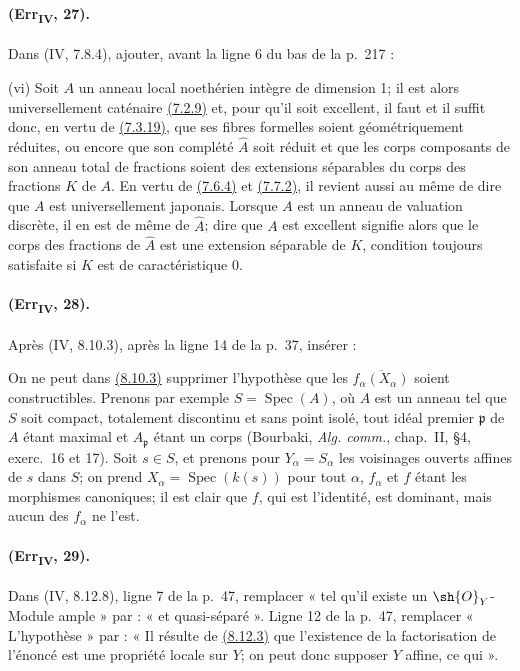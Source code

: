 \paragraph{(Err\textsubscript{IV}, 27).}
Dans (IV, 7.8.4), ajouter, avant la ligne 6 du bas de la p.~217 :

\smallskip
\noindent
\textup{(vi)} Soit $A$ un anneau local noethérien intègre de dimension
1; il est alors universellement caténaire
{\hyperlink{ega4.c04.cor.7-2-9}{(7.2.9)}} et, pour qu'il soit excellent,
il faut et il suffit donc, en vertu de
{\hyperlink{ega4.c04.statement.7-3-19}{(7.3.19)}}, que ses fibres
formelles soient géométriquement réduites, ou encore que son complété
$\widehat A$ soit réduit et que les corps composants de son anneau total
de fractions soient des extensions séparables du corps des fractions
$K$ de $A$. En vertu de {\hyperlink{ega4.c04.thm.7-6-4}{(7.6.4)}} et
{\hyperlink{ega4.c04.thm.7-7-2}{(7.7.2)}}, il revient aussi au même de
dire que $A$ est universellement japonais. Lorsque $A$ est un anneau de
valuation discrète, il en est de même de $\widehat A$; dire que $A$ est
excellent signifie alors que le corps des fractions de $\widehat A$
est une extension séparable de $K$, condition toujours satisfaite si
$K$ est de caractéristique 0.

\paragraph{(Err\textsubscript{IV}, 28).}
Après (IV, 8.10.3), après la ligne 14 de la p.~37, insérer :

\begin{remark}[8.10.3.1]
\label{IV.8.10.3.1}
On ne peut dans {\hyperlink{ega4.c04.prop.8-10-3}{(8.10.3)}} supprimer
l'hypothèse que les $\overline{f_\alpha(X_\alpha)}$ soient
constructibles. Prenons par exemple $S=\operatorname{Spec}(A)$, où $A$
est un anneau tel que $S$ soit compact, totalement discontinu et sans
point isolé, tout idéal premier $\mathfrak p$ de $A$ étant maximal et
$A_\mathfrak p$ étant un corps (Bourbaki, \emph{Alg. comm.}, chap.~II,
\S4, exerc.~16 et 17). Soit $s\in S$, et prenons pour
$Y_\alpha=S_\alpha$ les voisinages ouverts affines de $s$ dans $S$; on
prend $X_\alpha=\operatorname{Spec}(k(s))$ pour tout $\alpha$,
$f_\alpha$ et $f$ étant les morphismes canoniques; il est clair que
$f$, qui est l'identité, est dominant, mais aucun des $f_\alpha$ ne
l'est.
\end{remark}

\paragraph{(Err\textsubscript{IV}, 29).}
Dans (IV, 8.12.8), ligne 7 de la p.~47, remplacer « tel qu'il existe un
$\sh{O}_Y$-Module ample » par : « et quasi-séparé ». Ligne 12 de la
p.~47, remplacer « L'hypothèse » par : « Il résulte de
{\hyperlink{ega4.c04.prop.8-12-3}{(8.12.3)}} que l'existence de la
factorisation de l'énoncé est une propriété locale sur $Y$; on peut
donc supposer $Y$ affine, ce qui ».

